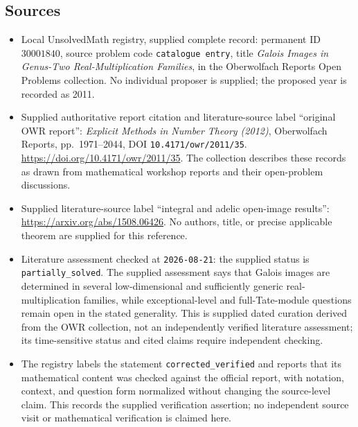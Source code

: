 \documentclass[11pt]{article}
\begin{document}
\subsection{Sources}
\begin{itemize}
\item Local UnsolvedMath registry, supplied complete record: permanent ID \(30001840\), source problem code \texttt{catalogue entry}, title \emph{Galois Images in Genus-Two Real-Multiplication Families}, in the Oberwolfach Reports Open Problems collection. No individual proposer is supplied; the proposed year is recorded as 2011.
\item Supplied authoritative report citation and literature-source label ``original OWR report'': \emph{Explicit Methods in Number Theory (2012)}, Oberwolfach Reports, pp.~1971--2044, DOI \texttt{10.4171/owr/2011/35}. \url{https://doi.org/10.4171/owr/2011/35}. The collection describes these records as drawn from mathematical workshop reports and their open-problem discussions.
\item Supplied literature-source label ``integral and adelic open-image results'': \url{https://arxiv.org/abs/1508.06426}. No authors, title, or precise applicable theorem are supplied for this reference.
\item Literature assessment checked at \texttt{2026-08-21}: the supplied status is \texttt{partially\_solved}. The supplied assessment says that Galois images are determined in several low-dimensional and sufficiently generic real-multiplication families, while exceptional-level and full-Tate-module questions remain open in the stated generality. This is supplied dated curation derived from the OWR collection, not an independently verified literature assessment; its time-sensitive status and cited claims require independent checking.
\item The registry labels the statement \texttt{corrected\_verified} and reports that its mathematical content was checked against the official report, with notation, context, and question form normalized without changing the source-level claim. This records the supplied verification assertion; no independent source visit or mathematical verification is claimed here.
\end{itemize}
\end{document}
